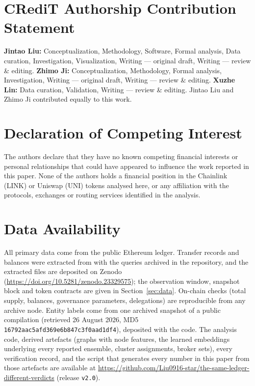 \section*{CRediT Authorship Contribution Statement}
\textbf{Jintao Liu:} Conceptualization, Methodology, Software, Formal
analysis, Data curation, Investigation, Visualization, Writing --- original
draft, Writing --- review \& editing.
\textbf{Zhimo Ji:} Conceptualization, Methodology, Formal analysis,
Investigation, Writing --- original draft, Writing --- review \& editing.
\textbf{Xuzhe Lin:} Data curation, Validation, Writing --- review \& editing.
Jintao Liu and Zhimo Ji contributed equally to this work.

\section*{Declaration of Competing Interest}
The authors declare that they have no known competing financial interests or
personal relationships that could have appeared to influence the work
reported in this paper. None of the authors holds a financial position in the
Chainlink (LINK) or Uniswap (UNI) tokens analysed here, or any affiliation
with the protocols, exchanges or routing services identified in the analysis.

\section*{Data Availability}
All primary data come from the public Ethereum ledger. Transfer records and
balances were extracted from
 with the
queries archived in the repository, and the extracted files are deposited
on Zenodo (\url{https://doi.org/10.5281/zenodo.23329575}); the observation window, snapshot block
and token contracts are given in Section~\ref{sec:data}. On-chain checks
(total supply, balances, governance parameters, delegations) are reproducible
from any archive node. Entity labels come from one archived snapshot of a
public compilation (retrieved 26 August 2026, MD5
\texttt{16792aac5afd369e6b847c3f0aad1df4}), deposited with the code. The
analysis code, derived artefacts (graphs with node features, the learned
embeddings underlying every reported ensemble, cluster assignments, broker
sets), every verification record, and the script that generates every number
in this paper from those artefacts are available at
\url{https://github.com/Liu0916-star/the-same-ledger-different-verdicts}
(release \texttt{v2.0}).

